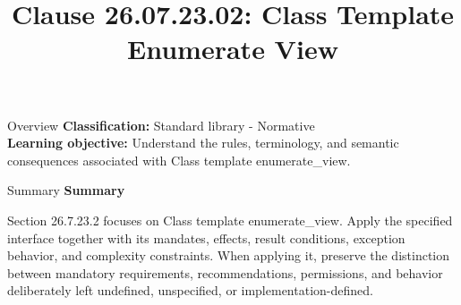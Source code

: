 \documentclass[10pt,letterpaper]{article}
\title{Clause 26.07.23.02: Class Template Enumerate View}
\author{}
\date{}
\begin{document}
\maketitle
\begin{CornellOverviewBox}{Overview}
\textbf{Classification:} Standard library - Normative\\[2pt]
\textbf{Learning objective:} Understand the rules, terminology, and semantic consequences associated with Class template enumerate\_view.
\end{CornellOverviewBox}\begin{CornellSummaryBox}{Summary}
{\sffamily\bfseries\color{Accent} Summary}\par\vspace{3pt}Section 26.7.23.2 focuses on Class template enumerate\_view. Apply the specified interface together with its mandates, effects, result conditions, exception behavior, and complexity constraints. When applying it, preserve the distinction between mandatory requirements, recommendations, permissions, and behavior deliberately left undefined, unspecified, or implementation-defined.
\end{CornellSummaryBox}
\end{document}

